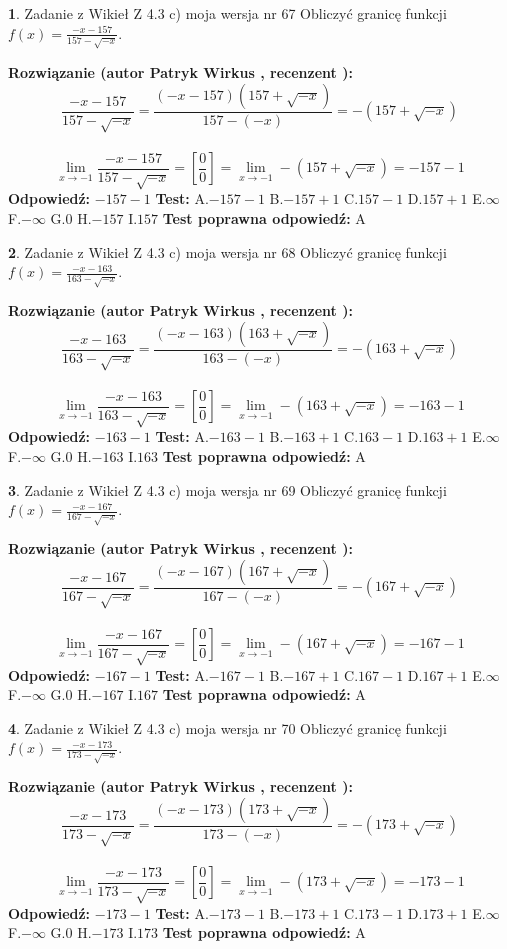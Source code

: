 \documentclass[12pt, a4paper]{article}
\theoremstyle{definition} %
\newtheorem{zad}{}
\newcommand{\zadStart}[1]{\begin{zad}#1\newline}
\newcommand{\zadStop}{\end{zad}}
\newcommand{\rozwStart}[2]{\noindent \textbf{Rozwiązanie (autor #1 , recenzent #2): }\newline}
\newcommand{\rozwStop}{\newline}
\newcommand{\odpStart}{\noindent \textbf{Odpowiedź:}\newline}
\newcommand{\odpStop}{\newline}
\newcommand{\testStart}{\noindent \textbf{Test:}\newline}
\newcommand{\testStop}{\newline}
\newcommand{\kluczStart}{\noindent \textbf{Test poprawna odpowiedź:}\newline}
\newcommand{\kluczStop}{\newline}
\begin{document}
\zadStart{Zadanie z Wikieł Z 4.3 c) moja wersja nr 67}
Obliczyć granicę funkcji $f(x)=\frac{-x-157}{157-\sqrt{-x}}$.
\zadStop
\rozwStart{Patryk Wirkus}{}
$$\frac{-x-157}{157-\sqrt{-x}}=\frac{(-x-157)(157+\sqrt{-x})}{157-(-x)}=-(157+\sqrt{-x})$$
\\
$$\lim\limits_{x\to-1}\frac{-x-157}{157-\sqrt{-x}}=[\frac{0}{0}]=\lim\limits_{x\to-1}-(157+\sqrt{-x}) =-157-1$$
\rozwStop
\odpStart
$-157-1$
\odpStop
\testStart
A.$-157-1$
B.$-157+1$
C.$157-1$
D.$157+1$
E.$\infty$
F.$-\infty$
G.$0$
H.$-157$
I.$157$
\testStop
\kluczStart
A
\kluczStop



\zadStart{Zadanie z Wikieł Z 4.3 c) moja wersja nr 68}
Obliczyć granicę funkcji $f(x)=\frac{-x-163}{163-\sqrt{-x}}$.
\zadStop
\rozwStart{Patryk Wirkus}{}
$$\frac{-x-163}{163-\sqrt{-x}}=\frac{(-x-163)(163+\sqrt{-x})}{163-(-x)}=-(163+\sqrt{-x})$$
\\
$$\lim\limits_{x\to-1}\frac{-x-163}{163-\sqrt{-x}}=[\frac{0}{0}]=\lim\limits_{x\to-1}-(163+\sqrt{-x}) =-163-1$$
\rozwStop
\odpStart
$-163-1$
\odpStop
\testStart
A.$-163-1$
B.$-163+1$
C.$163-1$
D.$163+1$
E.$\infty$
F.$-\infty$
G.$0$
H.$-163$
I.$163$
\testStop
\kluczStart
A
\kluczStop



\zadStart{Zadanie z Wikieł Z 4.3 c) moja wersja nr 69}
Obliczyć granicę funkcji $f(x)=\frac{-x-167}{167-\sqrt{-x}}$.
\zadStop
\rozwStart{Patryk Wirkus}{}
$$\frac{-x-167}{167-\sqrt{-x}}=\frac{(-x-167)(167+\sqrt{-x})}{167-(-x)}=-(167+\sqrt{-x})$$
\\
$$\lim\limits_{x\to-1}\frac{-x-167}{167-\sqrt{-x}}=[\frac{0}{0}]=\lim\limits_{x\to-1}-(167+\sqrt{-x}) =-167-1$$
\rozwStop
\odpStart
$-167-1$
\odpStop
\testStart
A.$-167-1$
B.$-167+1$
C.$167-1$
D.$167+1$
E.$\infty$
F.$-\infty$
G.$0$
H.$-167$
I.$167$
\testStop
\kluczStart
A
\kluczStop



\zadStart{Zadanie z Wikieł Z 4.3 c) moja wersja nr 70}
Obliczyć granicę funkcji $f(x)=\frac{-x-173}{173-\sqrt{-x}}$.
\zadStop
\rozwStart{Patryk Wirkus}{}
$$\frac{-x-173}{173-\sqrt{-x}}=\frac{(-x-173)(173+\sqrt{-x})}{173-(-x)}=-(173+\sqrt{-x})$$
\\
$$\lim\limits_{x\to-1}\frac{-x-173}{173-\sqrt{-x}}=[\frac{0}{0}]=\lim\limits_{x\to-1}-(173+\sqrt{-x}) =-173-1$$
\rozwStop
\odpStart
$-173-1$
\odpStop
\testStart
A.$-173-1$
B.$-173+1$
C.$173-1$
D.$173+1$
E.$\infty$
F.$-\infty$
G.$0$
H.$-173$
I.$173$
\testStop
\kluczStart
A
\kluczStop
\end{document}

